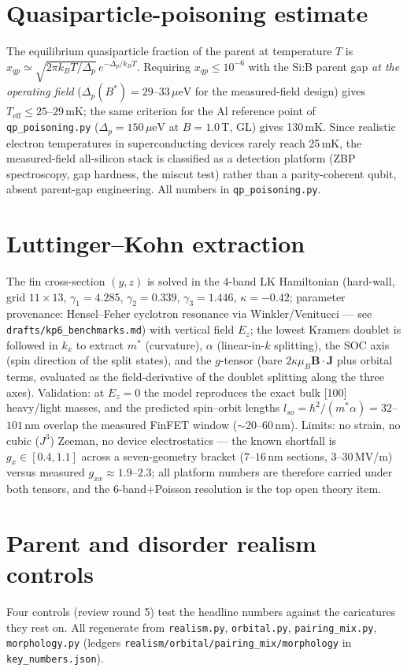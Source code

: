 \documentclass[11pt]{article}
\newcommand{\ueV}{\,\mu\mathrm{eV}}
\begin{document}
\section{Quasiparticle-poisoning estimate}\label{s:qp}
The equilibrium quasiparticle fraction of the parent at temperature $T$ is
$x_{qp} \simeq \sqrt{2\pi k_BT/\Delta_p}\, e^{-\Delta_p/k_BT}$. Requiring
$x_{qp} \le 10^{-6}$ with the Si:B parent gap \emph{at the operating
field} ($\Delta_p(B^*) = 29$--$33\ueV$ for the measured-field design)
gives $T_{\mathrm{eff}} \le 25$--$29$\,mK; the same criterion for the Al
reference point of \texttt{qp\_poisoning.py} ($\Delta_p = 150\ueV$ at
$B = 1.0$\,T, GL) gives 130\,mK. Since realistic
electron temperatures in superconducting devices rarely reach 25\,mK,
the measured-field all-silicon stack is classified as a detection
platform (ZBP spectroscopy, gap hardness, the miscut test) rather than a
parity-coherent qubit, absent parent-gap engineering. All numbers in
\texttt{qp\_poisoning.py}.

\section{Luttinger--Kohn extraction}\label{s:lk}
The fin cross-section $(y,z)$ is solved in the 4-band LK Hamiltonian
(hard-wall, grid $11\times13$, $\gamma_1 = 4.285$, $\gamma_2 = 0.339$,
$\gamma_3 = 1.446$, $\kappa = -0.42$; parameter provenance: Hensel--Feher
cyclotron resonance via Winkler/Venitucci --- see
\texttt{drafts/kp6\_benchmarks.md}) with vertical field $E_z$; the
lowest Kramers doublet is followed in $k_x$ to extract $m^*$ (curvature),
$\alpha$ (linear-in-$k$ splitting), the SOC axis (spin direction of the
split states), and the $g$-tensor (bare $2\kappa\mu_B\mathbf{B\cdot J}$
plus orbital terms, evaluated as the field-derivative of the doublet
splitting along the three axes). Validation: at $E_z = 0$ the model
reproduces the exact bulk [100] heavy/light masses, and the predicted
spin--orbit lengths $l_{so} = \hbar^2/(m^*\alpha) = 32$--$101$\,nm overlap
the measured FinFET window ($\sim$20--60\,nm). Limits: no strain, no cubic ($J^3$) Zeeman, no
device electrostatics --- the known shortfall is $g_x \in [0.4, 1.1]$
across a seven-geometry bracket ($7$--$16$\,nm sections, 3--30\,MV/m)
versus measured $g_{xx} \approx 1.9$--$2.3$; all platform numbers are
therefore carried under both tensors, and the 6-band+Poisson resolution
is the top open theory item.

\section{Parent and disorder realism controls}\label{s:controls}
Four controls (review round 5) test the headline numbers against the
caricatures they rest on. All regenerate from \texttt{realism.py},
\texttt{orbital.py}, \texttt{pairing\_mix.py}, \texttt{morphology.py}
(ledgers \texttt{realism/orbital/pairing\_mix/morphology} in
\texttt{key\_numbers.json}).
\end{document}
